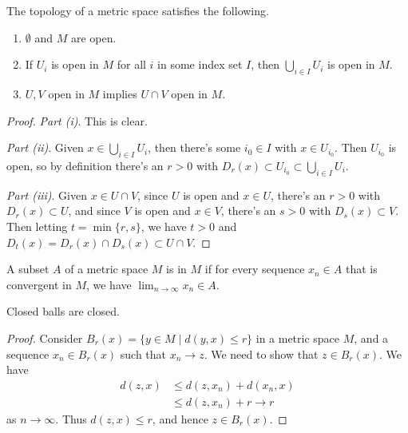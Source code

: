 \documentclass[a4paper]{scrartcl}
\begin{document}
\begin{proposition}
    The topology of a metric space satisfies the following.
    \begin{enumerate}[label=(\roman*)]
        \item $\emptyset$ and $M$ are open.
        \item If $U_i$ is open in $M$ for all $i$ in some index set $I$, then $\bigcup_{i \in I} U_i$ is open in $M$.
        \item $U, V$ open in $M$ implies $U \cap V$ open in $M$.
    \end{enumerate}
\end{proposition}
\begin{proof}
    \emph{Part (i)}. This is clear.

    \emph{Part (ii)}. Given $x \in \bigcup_{i \in I} U_i$, then there's some $i_0 \in I$ with $x \in U_{i_0}$. Then $U_{i_0}$ is open, so by definition there's an $r > 0$ with $D_r(x) \subset U_{i_0} \subset \bigcup_{i \in I} U_i$.

    \emph{Part (iii)}. Given $x \in U \cap V$, since $U$ is open and $x \in U$, there's an $r > 0$ with $D_r(x) \subset U$, and since $V$ is open and $x \in V$, there's an $s > 0$ with $D_s(x) \subset V$. Then letting $t = \min\{r, s\}$, we have $t >0$ and $D_t(x) = D_r(x) \cap D_s(x) \subset U \cap V$.
\end{proof}

\begin{definition}[Closed]
    A subset $A$ of a metric space $M$ is  in $M$ if for every sequence $x_n \in A$ that is convergent in $M$, we have $\lim_{n \to \infty} x_n \in A$.
\end{definition}

\begin{lemma}
    Closed balls are closed.
\end{lemma}
\begin{proof}
    Consider $B_r(x) = \{y \in M \mid d(y, x) \leq r\}$ in a metric space $M$, and a sequence $x_n \in B_r(x)$ such that $x_n \rightarrow z$. We need to show that $z \in B_r(x)$. We have
    \begin{align*}
        d(z, x) &\leq d(z, x_n) + d(x_n, x) \\
            &\leq d(z, x_n) + r \rightarrow r
    \end{align*}
    as $n \rightarrow \infty$. Thus $d(z, x) \leq r$, and hence $z \in B_r(x)$.
\end{proof}
\end{document}
